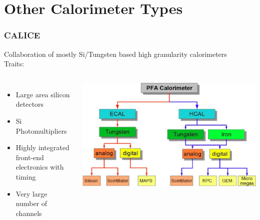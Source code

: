 \documentclass[aspectratio=169]{beamer}
\newcommand{\bluetext}[1]{%
  \textcolor{myBlue}{#1}
}
\begin{document}
%
%
\section{Other Calorimeter Types}

\begin{frame}
  \frametitle{CALICE}

  Collaboration of mostly Si/Tungsten based high granularity calorimeters\\[1ex]
  \bluetext{Traits:}
  \begin{columns}[c]
    \begin{itemize}
      \item Large area silicon detectors
      \item Si Photomultipliers
      \item Highly integrated front-end electronics with timing
      \item Very large number of channels
    \end{itemize}

    \includegraphics[width=\linewidth]{figures/CALICE_diagram.png}
  \end{columns}
\end{frame}
\end{document}
